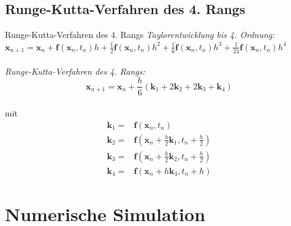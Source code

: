 \documentclass{beamer}
\begin{document}
\subsection{Runge-Kutta-Verfahren des 4. Rangs}
	\begin{frame}{Runge-Kutta-Verfahren des 4. Rangs}
	\textit{Taylorentwicklung bis 4. Ordnung:}\\$ \textbf{x}_{n+1}=\textbf{x}_n+\textbf{f}(\textbf{x}_n,t_n)h+\frac{1}{2}\dot{\textbf{f}}(\textbf{x}_n,t_n)h^2+\frac{1}{6}\ddot{\textbf{f}}(\textbf{x}_n,t_n)h^3+\frac{1}{24}\dddot{\textbf{f}}(\textbf{x}_n,t_n)h^4$\\~\\
	\textit{Runge-Kutta-Verfahren des 4. Rangs:}\\$$ \textbf{x}_{n+1}=\textbf{x}_n+\frac{h}{6}(\textbf{k}_1+2\textbf{k}_2+2\textbf{k}_3+\textbf{k}_4)$$\\
	mit \begin{align*}
	\textbf{k}_1=&\textbf{f}(\textbf{x}_n,t_n)\\
		\textbf{k}_2=&\textbf{f}(\textbf{x}_n+\frac{h}{2}\textbf{k}_1,t_n+\frac{h}{2})\\
	\textbf{k}_3=&\textbf{f}(\textbf{x}_n+\frac{h}{2}\textbf{k}_2,t_n+\frac{h}{2})\\
	\textbf{k}_4=&\textbf{f}(\textbf{x}_n+h\textbf{k}_3,t_n+h)	
	\end{align*}
	\end{frame}

\section{Numerische Simulation}
\end{document}
